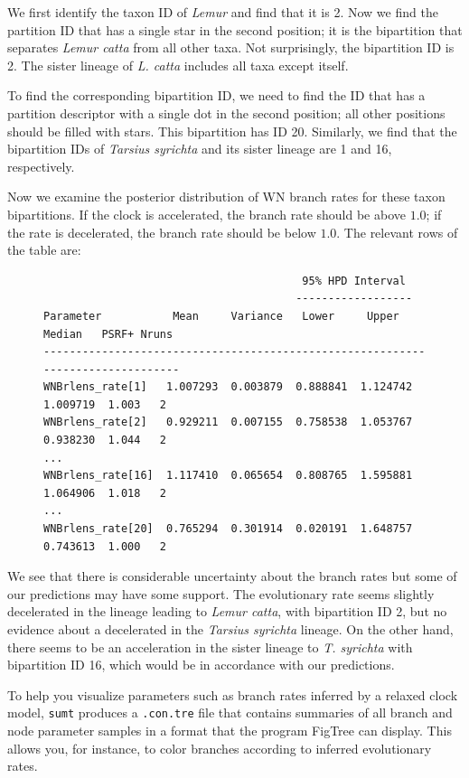 \documentclass[12pt]{book}
\begin{document}
We first identify the taxon ID of \textit{Lemur} and find that it is 2. Now we find the partition
ID that has a single star in the second position; it is the bipartition that separates
\textit{Lemur catta} from all other taxa. Not surprisingly, the bipartition ID is 2. The sister
lineage of \textit{L. catta} includes all taxa except itself.

To find the corresponding bipartition ID, we need to find the ID that has a partition descriptor
with a single dot in the second position; all other positions should be filled with stars. This
bipartition has ID 20. Similarly, we find that the bipartition IDs of \textit{Tarsius syrichta} and
its sister lineage are 1 and 16, respectively.

Now we examine the posterior distribution of WN branch rates for these taxon bipartitions. If the
clock is accelerated, the branch rate should be above $1.0$; if the rate is decelerated, the branch
rate should be below $1.0$. The relevant rows of the table are:

\begin{figure}[H]
\centering
\begin{BVerbatim}
                                        95% HPD Interval
                                       ------------------
Parameter           Mean     Variance   Lower     Upper     Median   PSRF+ Nruns
--------------------------------------------------------------------------------
WNBrlens_rate[1]   1.007293  0.003879  0.888841  1.124742  1.009719  1.003   2
WNBrlens_rate[2]   0.929211  0.007155  0.758538  1.053767  0.938230  1.044   2
...
WNBrlens_rate[16]  1.117410  0.065654  0.808765  1.595881  1.064906  1.018   2
...
WNBrlens_rate[20]  0.765294  0.301914  0.020191  1.648757  0.743613  1.000   2
\end{BVerbatim}
\end{figure}

We see that there is considerable uncertainty about the branch rates but some of our predictions
may have some support. The evolutionary rate seems slightly decelerated in the lineage leading to
\textit{Lemur catta}, with bipartition ID 2, but no evidence about a decelerated in the
\textit{Tarsius syrichta} lineage. On the other hand, there seems to be an acceleration in the
sister lineage to \textit{T. syrichta} with bipartition ID 16, which would be in accordance with
our predictions.

To help you visualize parameters such as branch rates inferred by a relaxed clock model,
\texttt{sumt} produces a \texttt{.con.tre} file that contains summaries of all branch and node
parameter samples in a format that the program FigTree can display. This allows you, for instance,
to color branches according to inferred evolutionary rates.
\end{document}

